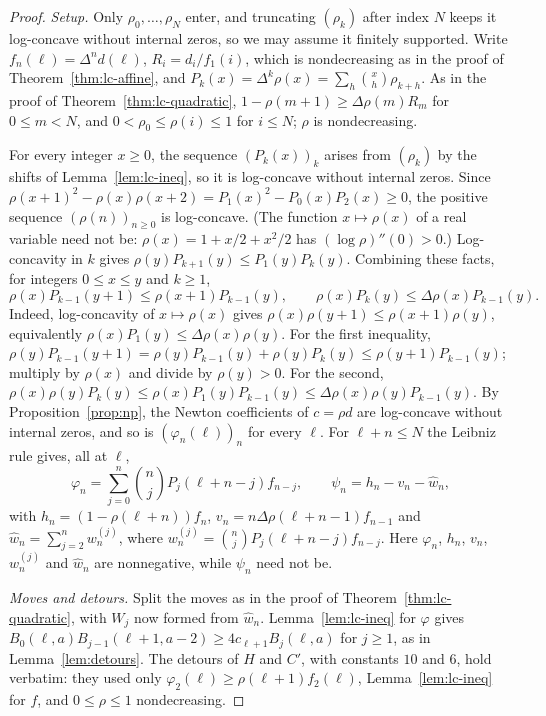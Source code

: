 \begin{proof}
\emph{Setup.} Only $\rho_0,\ldots,\rho_N$ enter, and truncating $(\rho_k)$ after index $N$ keeps it log-concave without internal zeros, so we may assume it finitely supported. Write $f_n(\ell)=\Delta^nd(\ell)$, $R_i=d_i/f_1(i)$, which is nondecreasing as in the proof of Theorem~\ref{thm:lc-affine}, and $P_k(x)=\Delta^k\rho(x)=\sum_h\binom xh\rho_{k+h}$. As in the proof of Theorem~\ref{thm:lc-quadratic}, $1-\rho(m+1)\geq\Delta\rho(m)R_m$ for $0\leq m<N$, and $0<\rho_0\leq\rho(i)\leq1$ for $i\leq N$; $\rho$ is nondecreasing.

For every integer $x\geq0$, the sequence $(P_k(x))_k$ arises from $(\rho_k)$ by the shifts of Lemma~\ref{lem:lc-ineq}, so it is log-concave without internal zeros. Since $\rho(x+1)^2-\rho(x)\rho(x+2)=P_1(x)^2-P_0(x)P_2(x)\geq0$, the positive sequence $(\rho(n))_{n\geq0}$ is log-concave. (The function $x\mapsto\rho(x)$ of a real variable need not be: $\rho(x)=1+x/2+x^2/2$ has $(\log\rho)''(0)>0$.) Log-concavity in $k$ gives $\rho(y)P_{k+1}(y)\leq P_1(y)P_k(y)$. Combining these facts, for integers $0\leq x\leq y$ and $k\geq1$,
\begin{equation}\label{eq:G-ratio}
\rho(x)P_{k-1}(y+1)\leq\rho(x+1)P_{k-1}(y),\qquad\rho(x)P_k(y)\leq\Delta\rho(x)P_{k-1}(y).
\end{equation}
Indeed, log-concavity of $x\mapsto\rho(x)$ gives $\rho(x)\rho(y+1)\leq\rho(x+1)\rho(y)$, equivalently $\rho(x)P_1(y)\leq\Delta\rho(x)\rho(y)$. For the first inequality, $\rho(y)P_{k-1}(y+1)=\rho(y)P_{k-1}(y)+\rho(y)P_k(y)\leq\rho(y+1)P_{k-1}(y)$; multiply by $\rho(x)$ and divide by $\rho(y)>0$. For the second, $\rho(x)\rho(y)P_k(y)\leq\rho(x)P_1(y)P_{k-1}(y)\leq\Delta\rho(x)\rho(y)P_{k-1}(y)$. By Proposition~\ref{prop:np}, the Newton coefficients of $c=\rho d$ are log-concave without internal zeros, and so is $(\varphi_n(\ell))_n$ for every $\ell$. For $\ell+n\leq N$ the Leibniz rule gives, all at $\ell$,
\[
\varphi_n=\sum_{j=0}^n\binom njP_j(\ell+n-j)f_{n-j},\qquad\psi_n=h_n-v_n-\widehat w_n,
\]
with $h_n=(1-\rho(\ell+n))f_n$, $v_n=n\Delta\rho(\ell+n-1)f_{n-1}$ and $\widehat w_n=\sum_{j=2}^nw^{(j)}_n$, where $w^{(j)}_n=\binom njP_j(\ell+n-j)f_{n-j}$. Here $\varphi_n$, $h_n$, $v_n$, $w^{(j)}_n$ and $\widehat w_n$ are nonnegative, while $\psi_n$ need not be.

\emph{Moves and detours.} Split the moves as in the proof of Theorem~\ref{thm:lc-quadratic}, with $W_j$ now formed from $\widehat w_n$. Lemma~\ref{lem:lc-ineq} for $\varphi$ gives $B_0(\ell,a)B_{j-1}(\ell+1,a-2)\geq4c_{\ell+1}B_j(\ell,a)$ for $j\geq1$, as in Lemma~\ref{lem:detours}. The detours of $H$ and $C'$, with constants $10$ and $6$, hold verbatim: they used only $\varphi_2(\ell)\geq\rho(\ell+1)f_2(\ell)$, Lemma~\ref{lem:lc-ineq} for $f$, and $0\leq\rho\leq1$ nondecreasing.


\end{proof}
